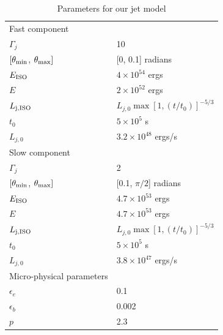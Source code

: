 \documentclass[usenatbib,fleqn]{mnras}
\begin{document}
\begin{table}
  \caption{\label{tab:jetParams}Parameters for our jet model}
  \begin{tabular}{ll}
    \hline
    Fast component\\ 
    $\Gamma_j$ & 10 \\
    $[\theta_{\rm min}$, $\theta_{\rm max}]$ & [0, 0.1] radians \\
    $E_{\rm ISO}$ & $4 \times 10^{54}$ ergs \\
    $E$ & $2 \times 10^{52}$ ergs\\
    $L_{\rm j,ISO}$ & $L_{j,0} \max\left[1, (t/t_0)\right]^{-5/3}$  \\
    $t_0$ & $5\times 10^5$ s\\
    $L_{j,0}$ & $3.2 \times 10^{48}$ ergs/s\\
    \hline 
    Slow component\\
    $\Gamma_j$ & 2 \\
    $[\theta_{\rm min}$, $\theta_{\rm max}]$ & [0.1, $\pi/2$] radians \\
    $E_{\rm ISO}$ & $4.7 \times 10^{53}$ ergs \\
    $E$ & $4.7 \times 10^{53}$ ergs\\
    $L_{\rm j, ISO}$ & $L_{j,0} \max\left[1, (t/t_0)\right]^{-5/3}$  \\
    $t_0$ & $5\times 10^5$ s\\
    $L_{j,0}$ & $3.8 \times 10^{47}$ ergs/s\\
    \hline
    Micro-physical parameters\\
    $\epsilon_e$ & 0.1\\
    $\epsilon_b$ & 0.002\\
    $p$ & 2.3\\
  \end{tabular}
\end{table}
\end{document}
